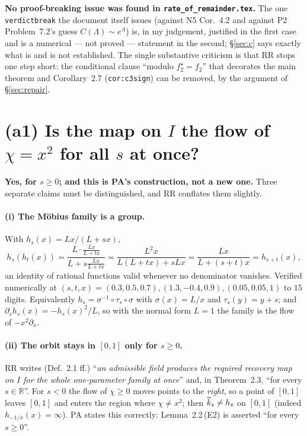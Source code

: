 \documentclass[11pt]{article}
\begin{document}
\textbf{No proof-breaking issue was found in \texttt{rate\_of\_remainder.tex}.}  The
one \texttt{verdictbreak} the document itself issues (against N5 Cor.~4.2 and against P2
Problem~7.2's guess $C(\Lambda)\sim e^\Lambda$) is, in my judgement, justified in the first case
and is a numerical --- not proved --- statement in the second; \S\ref{sec:c} says exactly what is
and is not established.  The single substantive criticism is that RR stops one step short: the
conditional clause ``modulo $f_2^\star=f_2$'' that decorates the main theorem and
Corollary~2.7 (\texttt{cor:c3sign}) can be removed, by the argument of \S\ref{sec:repair}.

\tableofcontents

\section{(a1) Is the map on $I$ the flow of $\chi=x^2$ for all $s$ at once?}\label{sec:a1}

\textbf{Yes, for $s\ge0$; and this is PA's construction, not a new one.}  Three separate claims must
be distinguished, and RR conflates them slightly.

\paragraph{(i) The M\"obius family is a group.}  With $h_s(x)=Lx/(L+sx)$,
\[
 h_s(h_t(x))=\frac{L\cdot\frac{Lx}{L+tx}}{L+s\frac{Lx}{L+tx}}
 =\frac{L^2x}{L(L+tx)+sLx}=\frac{Lx}{L+(s+t)x}=h_{s+t}(x),
\]
an identity of rational functions valid whenever no denominator vanishes.  Verified numerically at
$(s,t,x)=(0.3,0.5,0.7),(1.3,-0.4,0.9),(0.05,0.05,1)$ to $15$ digits.  Equivalently
$h_s=\sigma^{-1}\circ\tau_s\circ\sigma$ with $\sigma(x)=L/x$ and $\tau_s(y)=y+s$; and
$\partial_sh_s(x)=-h_s(x)^2/L$, so with the normal form $L=1$ the family is the flow of $-x^2\partial_x$.

\paragraph{(ii) The orbit stays in $[0,1]$ only for $s\ge0$.}  RR writes (Def.~2.1 ff.)
``\emph{an admissible field produces the required recovery map on $I$ for the whole one-parameter
family at once}'' and, in Theorem~2.3, ``for every $s\in\mathbb R$''.  For $s<0$ the flow of
$\chi\ge0$ moves points to the \emph{right}, so a point of $[0,1]$ leaves $[0,1]$ and enters the
region where $\chi\ne x^2$; then $\widetilde k_s\ne h_s$ on $[0,1]$ (indeed $h_{-1/x}(x)=\infty$).  PA states
this correctly: Lemma~2.2\,(E2) is asserted ``for every $s\ge0$''.
\end{document}
